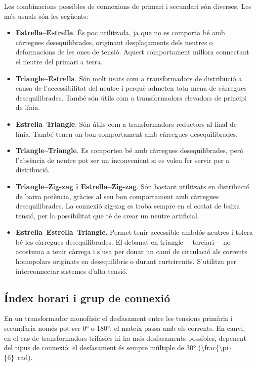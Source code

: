 Les combinacions possibles de connexions de primari i secundari són diverses. Les més usuals són les següents:
\begin{itemize}
   \item \textbf{Estrella--Estrella}. És poc utilitzada, ja que no es comporta bé amb càrregues desequilibrades, originant desplaçaments dels neutres o deformacions de les ones de tensió. Aquest comportament millora connectant el neutre del primari a terra. 
   \item \textbf{Triangle--Estrella}. Són molt usats com a transformadors de distribució a causa de l'accessibilitat del neutre i perquè admeten tota mena de càrregues desequilibrades. També són útils com a transformadors elevadors de principi de línia.
   \item \textbf{Estrella--Triangle}. Són útils com a transformadors reductors al final de línia. També tenen un bon comportament  amb càrregues desequilibrades.
   \item \textbf{Triangle--Triangle}. Es comporten bé amb càrregues desequilibrades, però l'absència de neutre pot ser un inconvenient si es volen fer servir per a distribució.
   \item \textbf{Triangle--Zig-zag i Estrella--Zig-zag}. Són bastant utilitzats en distribució de baixa potència, gràcies al seu bon comportament amb càrregues desequilibrades. La connexió zig-zag es troba sempre en el costat de baixa tensió, per la possibilitat que té de crear un neutre artificial.
   \item \textbf{Estrella--Estrella--Triangle}. Permet tenir accessible ambdós  neutres i tolera  bé les càrregues  desequilibrades. El debanat en triangle ---terciari--- no acostuma a tenir càrrega i s'usa per donar un camí de circulació als corrents homopolars originats en desequilibris o durant curtcircuits. S'utilitza per interconnectar sistemes d'alta tensió.
\end{itemize}


\subsection{Índex horari i grup de connexió}\label{sec:connex-index-horari}

En un transformador monofàsic el desfasament entre les tensions primària i secundària només pot ser \ang{0} o \ang{180}; el mateix passa amb els corrents. En canvi, en el cas de transformadors trifàsics hi ha més desfasaments possibles, depenent del tipus de connexió; el desfasament és sempre múltiple de \ang{30} 
(\qty[parse-numbers=false]{\frac{\pi}{6}}{rad}).

